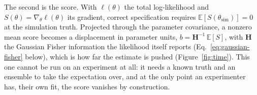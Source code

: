 
The second is the score. With $\ell(\theta)$ the total log-likelihood and $S(\theta)=\nabla_\theta\ell(\theta)$ its gradient, correct specification requires $\mathbb{E}[S(\theta_{\mathrm{sim}})]=0$ at the simulation truth. Projected through the parameter covariance, a nonzero mean score becomes a displacement in parameter units, $b=\mathbf{H}^{-1}\,\mathbb{E}[S]$, with $\mathbf{H}$ the Gaussian Fisher information the likelihood itself reports (Eq.~\ref{eq:gaussian-fisher} below), which is how far the estimate is pushed (Figure~\ref{fig:time}). This one cannot be run on an experiment at all: it needs a known truth and an ensemble to take the expectation over, and at the only point an experimenter has, their own fit, the score vanishes by construction.

